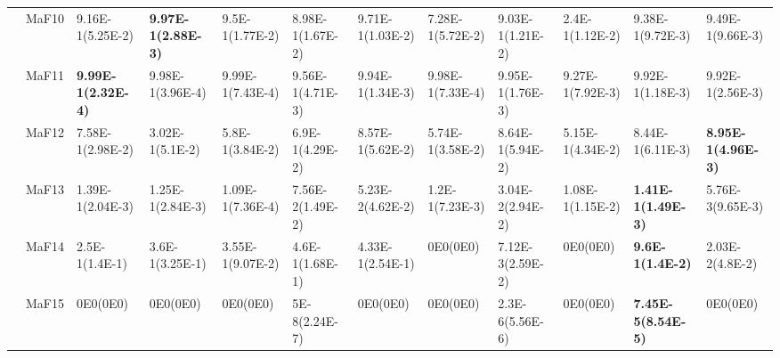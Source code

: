 \documentclass[]{article}
\begin{document}
\begin{landscape}
\begin{table}
\begin{footnotesize}
\begin{tabular}{|l|l|l|l|l|l|l|l|l|l|l|l|}
 & MaF10 & 9.16E-1(5.25E-2) & \cellcolor{gray95} {\bf 9.97E-1(2.88E-3)} & \cellcolor{gray95} 9.5E-1(1.77E-2) & 8.98E-1(1.67E-2) & \cellcolor{gray95} 9.71E-1(1.03E-2) & 7.28E-1(5.72E-2) & 9.03E-1(1.21E-2) & 2.4E-1(1.12E-2) & 9.38E-1(9.72E-3) & 9.49E-1(9.66E-3)\\
 & MaF11 & \cellcolor{gray95} {\bf 9.99E-1(2.32E-4)} & \cellcolor{gray95} 9.98E-1(3.96E-4) & \cellcolor{gray95} 9.99E-1(7.43E-4) & 9.56E-1(4.71E-3) & 9.94E-1(1.34E-3) & \cellcolor{gray95} 9.98E-1(7.33E-4) & 9.95E-1(1.76E-3) & 9.27E-1(7.92E-3) & 9.92E-1(1.18E-3) & 9.92E-1(2.56E-3)\\
 & MaF12 & 7.58E-1(2.98E-2) & 3.02E-1(5.1E-2) & 5.8E-1(3.84E-2) & 6.9E-1(4.29E-2) & \cellcolor{gray95} 8.57E-1(5.62E-2) & 5.74E-1(3.58E-2) & \cellcolor{gray95} 8.64E-1(5.94E-2) & 5.15E-1(4.34E-2) & \cellcolor{gray95} 8.44E-1(6.11E-3) & \cellcolor{gray95} {\bf 8.95E-1(4.96E-3)}\\
 & MaF13 & \cellcolor{gray95} 1.39E-1(2.04E-3) & \cellcolor{gray95} 1.25E-1(2.84E-3) & 1.09E-1(7.36E-4) & 7.56E-2(1.49E-2) & 5.23E-2(4.62E-2) & \cellcolor{gray95} 1.2E-1(7.23E-3) & 3.04E-2(2.94E-2) & 1.08E-1(1.15E-2) & \cellcolor{gray95} {\bf 1.41E-1(1.49E-3)} & 5.76E-3(9.65E-3)\\
 & MaF14 & 2.5E-1(1.4E-1) & 3.6E-1(3.25E-1) & 3.55E-1(9.07E-2) & \cellcolor{gray95} 4.6E-1(1.68E-1) & \cellcolor{gray95} 4.33E-1(2.54E-1) & 0E0(0E0) & 7.12E-3(2.59E-2) & 0E0(0E0) & \cellcolor{gray95} {\bf 9.6E-1(1.4E-2)} & 2.03E-2(4.8E-2)\\
 & MaF15 & 0E0(0E0) & 0E0(0E0) & 0E0(0E0) & 5E-8(2.24E-7) & 0E0(0E0) & 0E0(0E0) & 2.3E-6(5.56E-6) & 0E0(0E0) & \cellcolor{gray95} {\bf 7.45E-5(8.54E-5)} & 0E0(0E0)\\
\hline


\end{tabular}
\end{footnotesize}
\end{table}
\end{landscape}
\end{document}
